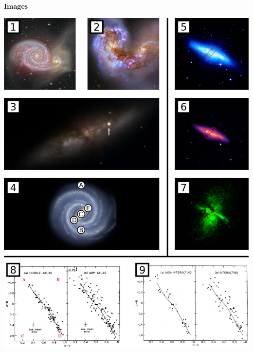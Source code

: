 \documentclass{exam}
\begin{document}
\newpage
\par\noindent \textbf{\large  Images}
		\par\noindent
	\begin{center}
		\includegraphics[width=.9\textwidth]{images/diagram-sheet.png}
	\end{center}
\newpage
\end{document}
